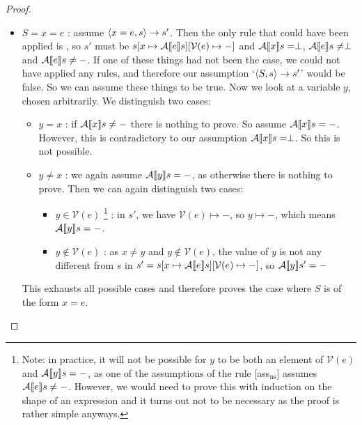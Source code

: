 \begin{proof}
\begin{itemize}[noitemsep]
    \item $S = x = e$ : assume $\langle x = e, s \rangle \to s'$. Then the only rule that could have been applied is \assns, so  $s'$ must be $s[x \mapsto \mathcal{A} \llbracket e \rrbracket s][\mathcal{V}(e)\mapsto-]$ and $\mathcal{A} \llbracket x \rrbracket s = \perp$, $\mathcal{A} \llbracket e \rrbracket s \neq \perp$ and $\mathcal{A} \llbracket e \rrbracket s \neq -$. If one of these things had not been the case, we could not have applied any rules, and therefore our assumption `$\langle S, s \rangle \to s'$' would be false. So we can assume these things to be true. Now we look at a variable $y$, chosen arbitrarily. We distinguish two cases:
    \begin{itemize}[noitemsep]
        \item $y=x$ : if $\mathcal{A} \llbracket x \rrbracket s \not = -$ there is nothing to prove. So assume $\mathcal{A} \llbracket x \rrbracket s = -$. However, this is contradictory to our assumption $\mathcal{A} \llbracket x \rrbracket s = \perp$. So this is not possible.
        \item $y\not = x$ : we again assume $\mathcal{A} \llbracket y \rrbracket s = -$, as otherwise there is nothing to prove. Then we can again distinguish two cases: 
        \begin{itemize}[noitemsep]
            \item $y \in \mathcal{V}(e)$ \footnote{Note: in practice, it will not be possible for $y$ to be both an element of $\mathcal{V}(e)$ and $\mathcal{A} \llbracket y \rrbracket s = -$, as one of the assumptions of the rule [ass$_{\textrm{ns}}$] assumes $\mathcal{A} \llbracket e \rrbracket s \neq -$. However, we would need to prove this with induction on the shape of an expression and it turns out not to be necessary as the proof is rather simple anyways.} : in $s'$, we have $\mathcal{V}(e)\mapsto-$, so $y \mapsto -$, which means $\mathcal{A} \llbracket y \rrbracket s = -$.
            \item $y \not \in \mathcal{V}(e)$ : as $x \not = y$ and $y \not \in \mathcal{V}(e)$, the value of $y$ is not any different from $s$ in $s'=s[x \mapsto \mathcal{A} \llbracket e \rrbracket s][\mathcal{V}(e)\mapsto-]$, so $\mathcal{A} \llbracket y \rrbracket s' = -$
        \end{itemize}
    \end{itemize}
    This exhausts all possible cases and therefore proves the case where $S$ is of the form $x = e$.
    

\end{itemize}
\end{proof}
